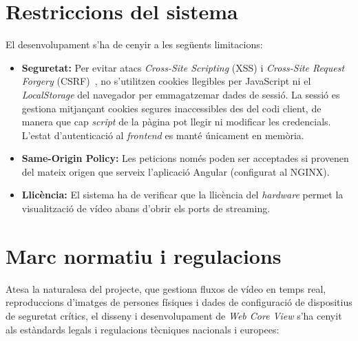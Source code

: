 \section{Restriccions del sistema}
El desenvolupament s'ha de cenyir a les següents limitacions:
\begin{itemize}
  \item \textbf{Seguretat:} Per evitar atacs \textit{Cross-Site Scripting} (XSS) i \textit{Cross-Site Request Forgery} (CSRF)~\cite{owasp_top10}, no s'utilitzen cookies llegibles per JavaScript ni el \textit{LocalStorage} del navegador per emmagatzemar dades de sessió. La sessió es gestiona mitjançant cookies segures inaccessibles des del codi client, de manera que cap \textit{script} de la pàgina pot llegir ni modificar les credencials. L'estat d'autenticació al \textit{frontend} es manté únicament en memòria.
  \item \textbf{Same-Origin Policy:} Les peticions només poden ser acceptades si provenen del mateix origen que serveix l'aplicació Angular (configurat al NGINX).
  \item \textbf{Llicència:} El sistema ha de verificar que la llicència del \textit{hardware} permet la visualització de vídeo abans d'obrir els ports de streaming.
\end{itemize}
\section{Marc normatiu i regulacions}
Atesa la naturalesa del projecte, que gestiona fluxos de vídeo en temps real, reproduccions d'imatges de persones físiques i dades de configuració de dispositius de seguretat crítics, el disseny i desenvolupament de \textit{Web Core View} s'ha cenyit als estàndards legals i regulacions tècniques nacionals i europees:

